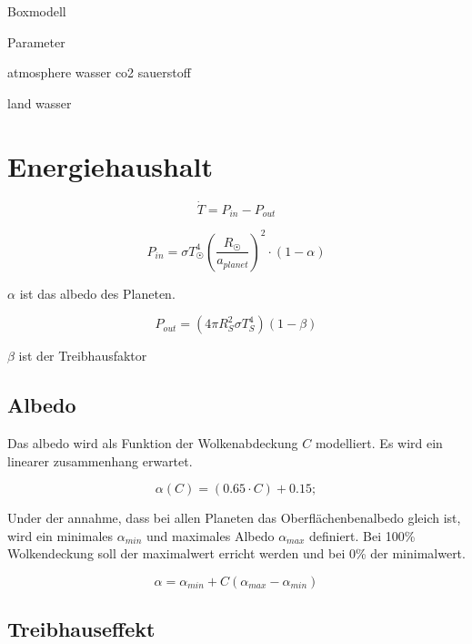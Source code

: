 \begin{refsection}
Boxmodell

Parameter

atmosphere
wasser
co2
sauerstoff

land
wasser





\section{Energiehaushalt}

\begin{equation}
\dot{T} = P_{in} - P_{out}
\end{equation}



\begin{equation}
P_{in} = \sigma T_{\astrosun}^4 \left( \frac{R_{\astrosun}}{a_{planet}} \right) ^2 \cdot (1-\alpha)
\end{equation}

$\alpha$ ist das albedo des Planeten.

\begin{equation}
P_{out} = (4 \pi R_{S}^2 \sigma T_{S}^4)(1 - \beta)
\end{equation}

$\beta$ ist der Treibhausfaktor

\subsection{Albedo}

Das albedo wird als Funktion der Wolkenabdeckung $C$ modelliert. Es wird ein linearer zusammenhang erwartet.

\begin{equation}
\alpha(C) = (0.65 \cdot C) + 0.15;
\end{equation}


Under der annahme, dass bei allen Planeten das Oberflächenbenalbedo gleich ist, wird ein minimales $\alpha_{min}$ und maximales Albedo $\alpha_{max}$ definiert. Bei 100\% Wolkendeckung soll der maximalwert erricht werden und bei 0\% der minimalwert.

\begin{equation}
\alpha = \alpha_{min} + C(\alpha_{max} - \alpha_{min})
\end{equation}

\subsection{Treibhauseffekt}


\end{refsection}
